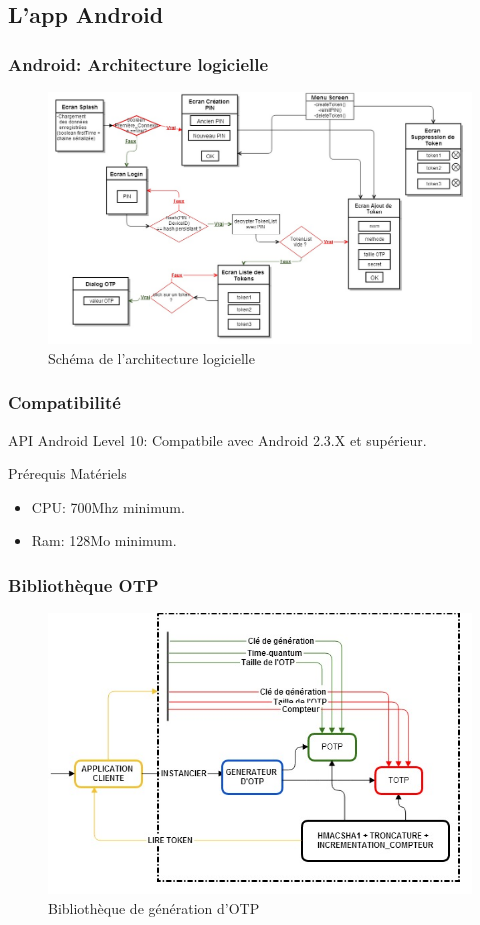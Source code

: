 \documentclass[xcolor=table]{beamer}
\begin{document}
\subsection{L'app Android}
\begin{frame}
\frametitle{Android: Architecture logicielle}
\begin{figure}
 \includegraphics[scale=0.3]{../graphics/archi-android.jpg} 
 \caption{Schéma de l'architecture logicielle}
\end{figure}

\end{frame}

\begin{frame}
\frametitle{Compatibilité}
\begin{block}{API Android}
Level 10: Compatbile avec Android 2.3.X et supérieur.
\end{block}
\begin{block}{Prérequis Matériels}
\begin{itemize}
\item CPU: 700Mhz minimum.
\item Ram: 128Mo minimum.
\end{itemize}
\end{block}
\end{frame}


\begin{frame}
\frametitle{Bibliothèque OTP}
\begin{figure}
 \includegraphics[scale=0.3]{../graphics/libotp-android.jpg} 
 \caption{Bibliothèque de génération d'OTP}
\end{figure}
\end{frame}
\end{document}
